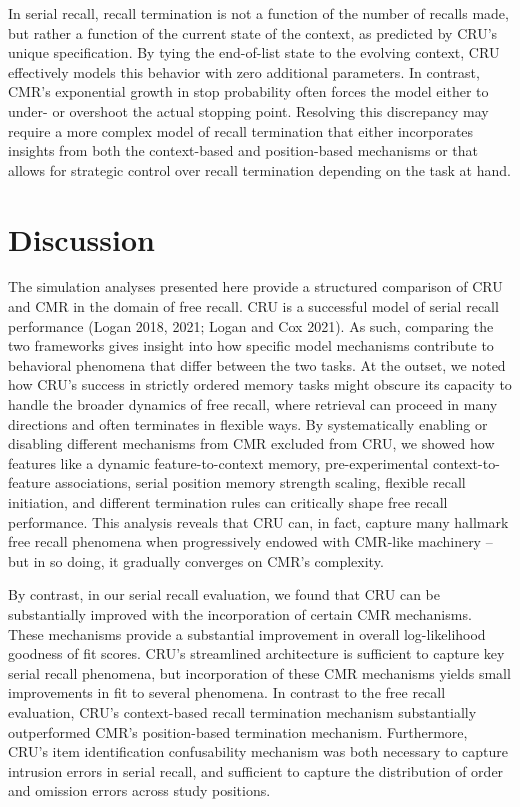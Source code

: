 \documentclass[
  letterpaper,
  DIV=11,
  numbers=noendperiod]{scrartcl}
\begin{document}
In serial recall, recall termination is not a function of the number of
recalls made, but rather a function of the current state of the context,
as predicted by CRU's unique specification. By tying the end-of-list
state to the evolving context, CRU effectively models this behavior with
zero additional parameters. In contrast, CMR's exponential growth in
stop probability often forces the model either to under- or overshoot
the actual stopping point. Resolving this discrepancy may require a more
complex model of recall termination that either incorporates insights
from both the context-based and position-based mechanisms or that allows
for strategic control over recall termination depending on the task at
hand.

\section{Discussion}\label{discussion}

The simulation analyses presented here provide a structured comparison
of CRU and CMR in the domain of free recall. CRU is a successful model
of serial recall performance (Logan 2018, 2021; Logan and Cox 2021). As
such, comparing the two frameworks gives insight into how specific model
mechanisms contribute to behavioral phenomena that differ between the
two tasks. At the outset, we noted how CRU's success in strictly ordered
memory tasks might obscure its capacity to handle the broader dynamics
of free recall, where retrieval can proceed in many directions and often
terminates in flexible ways. By systematically enabling or disabling
different mechanisms from CMR excluded from CRU, we showed how features
like a dynamic feature-to-context memory, pre-experimental
context-to-feature associations, serial position memory strength
scaling, flexible recall initiation, and different termination rules can
critically shape free recall performance. This analysis reveals that CRU
can, in fact, capture many hallmark free recall phenomena when
progressively endowed with CMR-like machinery -- but in so doing, it
gradually converges on CMR's complexity.

By contrast, in our serial recall evaluation, we found that CRU can be
substantially improved with the incorporation of certain CMR mechanisms.
These mechanisms provide a substantial improvement in overall
log-likelihood goodness of fit scores. CRU's streamlined architecture is
sufficient to capture key serial recall phenomena, but incorporation of
these CMR mechanisms yields small improvements in fit to several
phenomena. In contrast to the free recall evaluation, CRU's
context-based recall termination mechanism substantially outperformed
CMR's position-based termination mechanism. Furthermore, CRU's item
identification confusability mechanism was both necessary to capture
intrusion errors in serial recall, and sufficient to capture the
distribution of order and omission errors across study positions.
\end{document}
